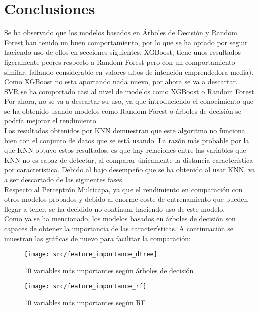 \section{Conclusiones}
Se ha observado que los modelos basados en Árboles de Decisión y Random Forest han tenido un buen comportamiento, por lo que se ha optado por seguir haciendo uso de ellos en secciones siguientes. XGBoost, tiene unos resultados ligeramente peores respecto a Random Forest pero con un comportamiento similar, fallando considerable en valores altos de intención emprendedora media). Como XGBoost no esta aportando nada nuevo, por ahora se va a descartar.\\
\linebreak
SVR se ha comportado casi al nivel de modelos como XGBoost o Random Forest. Por ahora, no se va a descartar su uso, ya que introduciendo el conocimiento que se ha obtenido usando modelos como Random Forest o árboles de decisión se podría mejorar el rendimiento.\\
\linebreak
Los resultados obtenidos por  KNN demuestran que este algoritmo no funciona bien con el conjunto de datos que se está usando. La razón más probable por la que KNN obtuvo estos resultados, es que hay relaciones entre las variables que KNN no es capaz de detectar, al comparar únicamente la distancia característica por característica. Debido al bajo desempeño que se ha obtenido al usar KNN, va a ser descartado de las siguientes fases.\\
\linebreak
Respecto al Perceptrón Multicapa, ya que el rendimiento en comparación con otros modelos probados y debido al enorme coste de entrenamiento que pueden llegar a tener, se ha decidido no continuar haciendo uso de este modelo.\\
\linebreak
Como ya se ha mencionado, los modelos basados en árboles de decisión son capaces de obtener la importancia de las características. A continuación se muestran las gráficas de nuevo para facilitar la comparación:
\begin{figure}[H]
	\centering
	\texttt{[image: src/feature\_importance\_dtree]}
	\caption{10 variables más importantes según árboles de decisión}
	\label{fig:feature_dtree2}
\end{figure}
\begin{figure}[H]
	\centering
	\texttt{[image: src/feature\_importance\_rf]}
	\caption{10 variables más importantes según RF}
	\label{fig:feature_rf2}
\end{figure}

